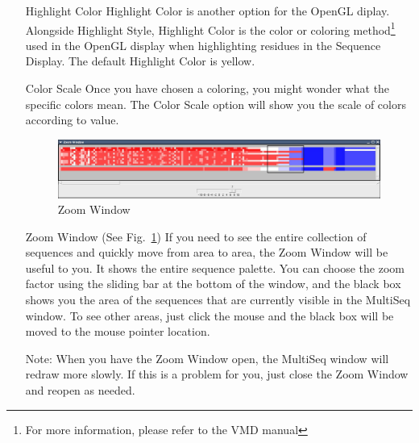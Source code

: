 \begin{itemize}
\item[Highlight Color]
\textsf{Highlight Color} is another option for the OpenGL diplay.
Alongside \textsf{Highlight Style}, \textsf{Highlight Color} is the
color or coloring method\footnote{For more information, please refer to
the VMD manual} used in the OpenGL display when highlighting residues in
the Sequence Display.  The default \textsf{Highlight Color} is yellow.

\item[Color Scale]  Once you have chosen a coloring, you might wonder
what the specific colors mean.  The \textsf{Color Scale} option will
show you the scale of colors according to value.

\begin{figure}[here]
 \centerline{\includegraphics [width=5in]{./pictures/zoomWindow.jpg}}
 \caption{Zoom Window}
\label{fig:zoomWindow}
\end{figure}
\item [Zoom Window] (See Fig.~\ref{fig:zoomWindow}) If you need to see
the entire collection of sequences and quickly move from area to area,
the \textsf{Zoom Window} will be useful to you.  It shows the entire
sequence palette.  You can choose the zoom factor using the sliding bar
at the bottom of the window, and the black box shows you the area of the
sequences that are currently visible in the MultiSeq window.  To see
other areas, just click the mouse and the black box will be moved to the
mouse pointer location.

Note:  When you have the \textsf{Zoom Window} open, the MultiSeq window
will redraw more slowly.  If this is a problem for you, just close the
\textsf{Zoom Window} and reopen as needed.

\end{itemize}

